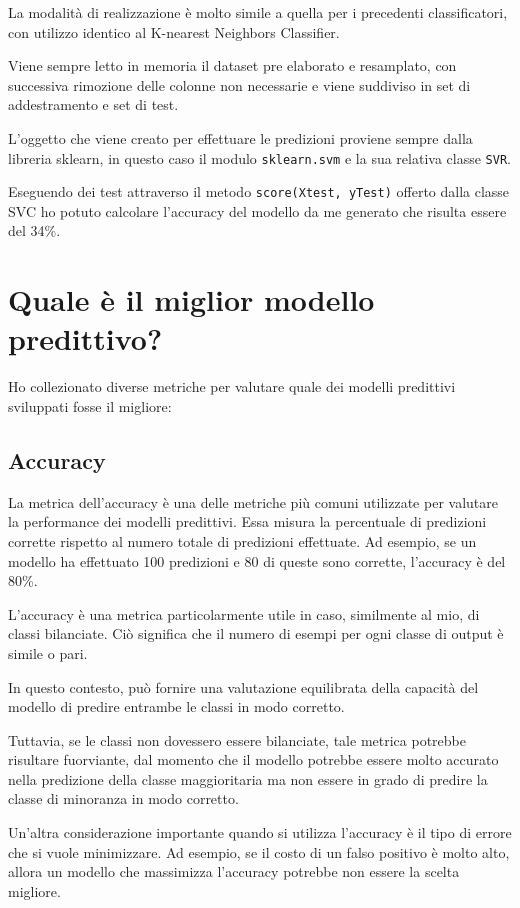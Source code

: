 La modalità di realizzazione è molto simile a quella per i precedenti classificatori, con utilizzo identico al K-nearest Neighbors Classifier.

Viene sempre letto in memoria il dataset pre elaborato e resamplato, con successiva rimozione delle colonne non necessarie e viene suddiviso in set di addestramento e set di test.

L’oggetto che viene creato per effettuare le predizioni proviene sempre dalla libreria sklearn, in questo caso il modulo \texttt{sklearn.svm} e la sua relativa classe \texttt{SVR}.

Eseguendo dei test attraverso il metodo \mintinline[bgcolor=bg]
{python}{score(Xtest, yTest)} offerto dalla classe SVC ho potuto calcolare l’accuracy del modello da me generato che risulta essere del 34\%.


\section{Quale è il miglior modello predittivo?}
Ho collezionato diverse metriche per valutare quale dei modelli predittivi sviluppati fosse il migliore: 
\subsection{Accuracy}
La metrica dell'accuracy è una delle metriche più comuni utilizzate per valutare la performance dei modelli predittivi. Essa misura la percentuale di predizioni corrette rispetto al numero totale di predizioni effettuate. Ad esempio, se un modello ha effettuato 100 predizioni e 80 di queste sono corrette, l'accuracy è del 80\%.

L'accuracy è una metrica particolarmente utile in caso, similmente al mio, di classi bilanciate. Ciò significa che il numero di esempi per ogni classe di output è simile o pari. 

In questo contesto, può fornire una valutazione equilibrata della capacità del modello di predire entrambe le classi in modo corretto. 

Tuttavia, se le classi  non dovessero essere bilanciate, tale metrica potrebbe risultare fuorviante, dal momento che il modello potrebbe essere molto accurato nella predizione della classe maggioritaria ma non essere in grado di predire la classe di minoranza in modo corretto.

Un'altra considerazione importante quando si utilizza l'accuracy è il tipo di errore che si vuole minimizzare. Ad esempio, se il costo di un falso positivo è molto alto, allora un modello che massimizza l'accuracy potrebbe non essere la scelta migliore.


